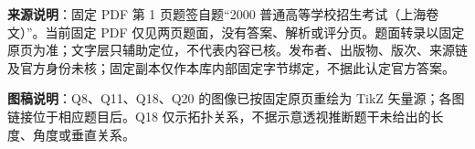 

\begin{gktip}
\textbf{来源说明}：固定 PDF 第 1 页题签自题“2000 普通高等学校招生考试（上海卷文）”。当前固定 PDF 仅见两页题面，没有答案、解析或评分页。题面转录以固定原页为准；文字层只辅助定位，不代表内容已核。发布者、出版物、版次、来源链及官方身份未核；固定副本仅作本库内部固定字节绑定，不据此认定官方答案。

\textbf{图稿说明}：Q8、Q11、Q18、Q20 的图像已按固定原页重绘为 TikZ 矢量源；各图链接位于相应题目后。Q18 仅示拓扑关系，不据示意透视推断题干未给出的长度、角度或垂直关系。
\end{gktip}



